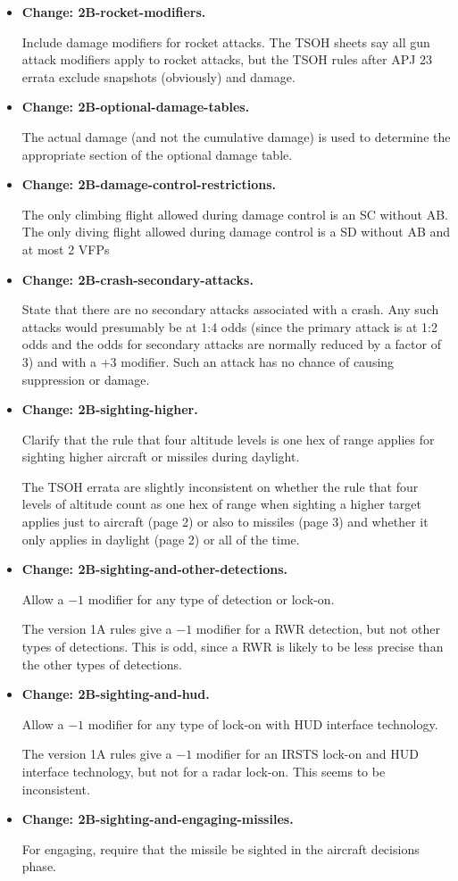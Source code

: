 \documentclass[10pt]{report}
\newcommand{\itemtag}[1]{\item \textbf{Change: #1.}\par}
\begin{document}
\begin{itemize}
    \itemtag{2B-rocket-modifiers} Include damage modifiers for rocket attacks. The TSOH sheets say all gun attack modifiers apply to rocket attacks, but the TSOH rules after APJ 23 errata exclude snapshots (obviously) and damage.
    
    \itemtag{2B-optional-damage-tables} The actual damage (and not the cumulative damage) is used to determine the appropriate section of the optional damage table.
    
    \itemtag{2B-damage-control-restrictions} The only climbing flight allowed during damage control is an SC without AB. The only diving flight allowed during damage control is a SD without AB and at most 2 VFPs
    
    \itemtag{2B-crash-secondary-attacks} State that there are no secondary attacks associated with a crash. Any such attacks would presumably be at 1:4 odds (since the primary attack is at 1:2 odds and the odds for secondary attacks are normally reduced by a factor of 3) and with a +3 modifier. Such an attack has no chance of causing suppression or damage.

    \itemtag{2B-sighting-higher} Clarify that the rule that four altitude levels is one hex of range applies for sighting higher aircraft or missiles during daylight.  
    
    The TSOH errata are slightly inconsistent on whether the rule that four levels of altitude count as one hex of range when sighting a higher target applies just to aircraft (page 2) or also to missiles (page 3) and whether it only applies in daylight (page 2) or all of the time.
    
    \itemtag{2B-sighting-and-other-detections} Allow a $-1$ modifier for any type of detection or lock-on. 
    
    The version 1A rules give a $-1$ modifier for a RWR detection, but not other types of detections. This is odd, since a RWR is likely to be less precise than the other types of detections.
    
    \itemtag{2B-sighting-and-hud} Allow a $-1$ modifier for any type of lock-on with HUD interface technology. 
    
    The version 1A rules give a $-1$ modifier for an IRSTS lock-on and HUD interface technology, but not for a radar lock-on. This seems to be inconsistent.

    \itemtag{2B-sighting-and-engaging-missiles} For engaging, require that the missile be sighted in the aircraft decisions phase.
    

\end{itemize}
\end{document}
